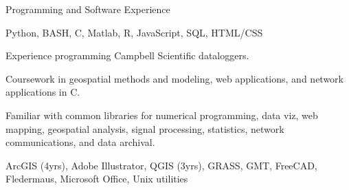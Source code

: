 \begin{cvlist}{Programming and Software Experience}
\item Python, BASH, C, Matlab, R, JavaScript, SQL, HTML/CSS
\item Experience programming Campbell Scientific dataloggers. 
\item Coursework in geospatial methods and modeling, web applications, and network applications in C.
\item Familiar with common libraries for numerical programming, data viz,
  web mapping, geospatial analysis, signal processing, statistics, network communications, and data archival. 
\item ArcGIS (4yrs), Adobe Illustrator, QGIS (3yrs), GRASS, GMT, FreeCAD, Fledermaus, Microsoft Office, Unix utilities
\end{cvlist}
